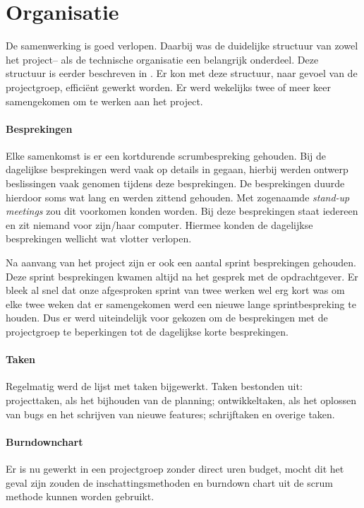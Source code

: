 \section{Organisatie}
De samenwerking is goed verlopen. Daarbij was de duidelijke structuur van zowel het project– als de technische organisatie een belangrijk onderdeel. Deze structuur is eerder beschreven in . Er kon met deze structuur, naar gevoel van de projectgroep, efficiënt gewerkt worden. Er werd wekelijks twee of meer keer samengekomen om te werken aan het project.

\paragraph{Besprekingen} Elke samenkomst is er een kortdurende scrumbespreking gehouden. Bij de dagelijkse besprekingen werd vaak op details in gegaan, hierbij werden ontwerp beslissingen vaak genomen tijdens deze besprekingen. De besprekingen duurde hierdoor soms wat lang en werden zittend gehouden. Met zogenaamde \emph{stand-up meetings} zou dit voorkomen konden worden. Bij deze besprekingen staat iedereen en zit niemand voor zijn/haar computer. Hiermee konden de dagelijkse besprekingen wellicht wat vlotter verlopen.

Na aanvang van het project zijn er ook een aantal sprint besprekingen gehouden. Deze sprint besprekingen kwamen altijd na het gesprek met de opdrachtgever. Er bleek al snel dat onze afgesproken sprint van twee werken wel erg kort was om elke twee weken dat er samengekomen werd een nieuwe lange sprintbespreking te houden. Dus er werd uiteindelijk voor gekozen om de besprekingen met de projectgroep te beperkingen tot de dagelijkse korte besprekingen.

\paragraph{Taken}
Regelmatig werd de lijst met taken bijgewerkt. Taken bestonden uit: projecttaken, als het bijhouden van de planning; ontwikkeltaken, als het oplossen van bugs en het schrijven van nieuwe features; schrijftaken en overige taken.

\paragraph{Burndownchart} Er is nu gewerkt in een projectgroep zonder direct uren budget, mocht dit het geval zijn zouden de inschattingsmethoden en burndown chart uit de scrum methode kunnen worden gebruikt.

